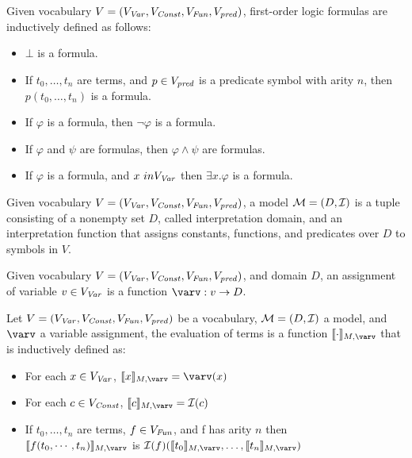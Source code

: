 \begin{mydef}[Formula]
	Given vocabulary $V = (V_{\mathit{Var}}, V_{\mathit{Const}}, V_{\mathit{Fun}}, V_{\mathit{pred}})$, first-order logic formulas are inductively defined as follows:
	\begin{itemize}
		\item $\bot$ is a formula.
		\item If  $t_0, \ldots, t_n$ are terms, and $p \in V_{\mathit{pred}}$ is a predicate symbol with arity $n$, then $p(t_0, \ldots, t_n)$ is a formula.
		\item If $\varphi$ is a formula, then $\neg \varphi$ is a formula.
		\item If $\varphi$ and $\psi$ are formulas, then $\varphi \land \psi$ are formulas.
		\item If $\varphi$ is a formula, and $x \ in V_{\mathit{Var}}$ then $\exists x. \varphi$ is a formula.
	\end{itemize}
\end{mydef}

\begin{mydef}[Model]
	Given vocabulary $V = (V_{\mathit{Var}}, V_{\mathit{Const}}, V_{\mathit{Fun}}, V_{\mathit{pred}})$, a model $\mathcal{M} = (D, \mathcal{I})$ is a tuple consisting of a nonempty set $D$, called interpretation domain, and an interpretation function \interpret that assigns constants, functions, and predicates over $D$ to symbols in $V$.
\end{mydef}

\begin{mydef}
	Given vocabulary $V = (V_{\mathit{Var}}, V_{\mathit{Const}}, V_{\mathit{Fun}}, V_{\mathit{pred}})$, and domain $D$, an assignment of variable $v \in V_{\mathit{Var}}$ is a function $\varv: v \rightarrow D$.
\end{mydef}

\begin{mydef}
	Let $V = (V_{\mathit{Var}}, V_{\mathit{Const}}, V_{\mathit{Fun}}, V_{\mathit{pred}})$ be a vocabulary, $\mathcal{M} = (D, \mathcal{I})$ a model, and $\varv$ a variable assignment, the evaluation of terms is a function $\eval{\cdot}$ that is inductively defined as:
	\begin{itemize}
		\item For each $x \in V_{\mathit{Var}}$, $\eval{x} = \varv(x)$
		\item For each $c \in V_{\mathit{Const}}$, $\eval{c} = \interpret(c)$
		\item If $t_0, \ldots, t_n$ are terms, $f \in V_{\mathit{Fun}}$, and f has arity $n$ then \\ $\eval{f(t_0, \cdots, t_n)}$ is $\interpret(f)(\eval{t_0}, \ldots, \eval{t_n})$
	\end{itemize}
\end{mydef}

